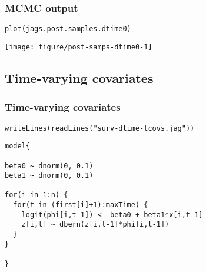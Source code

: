 \documentclass[color=usenames,dvipsnames]{beamer}\usepackage[]{graphicx}\usepackage[]{color}
\makeatletter
\newcommand{\hlstr}[1]{\textcolor[rgb]{0.749,0.012,0.012}{#1}}%
\newcommand{\hlstd}[1]{\textcolor[rgb]{0,0,0}{#1}}%
\newcommand{\hlkwd}[1]{\textcolor[rgb]{0.004,0.004,0.506}{#1}}%
\newenvironment{kframe}{%
 \def\at@end@of@kframe{}%
 \ifinner\ifhmode%
  \def\at@end@of@kframe{\end{minipage}}%
  \begin{minipage}{\columnwidth}%
 \fi\fi%
 \def\FrameCommand##1{\hskip\@totalleftmargin \hskip-\fboxsep
 \colorbox{shadecolor}{##1}\hskip-\fboxsep
     \hskip-\linewidth \hskip-\@totalleftmargin \hskip\columnwidth}%
 \MakeFramed {\advance\hsize-\width
   \@totalleftmargin\z@ \linewidth\hsize
   \@setminipage}}%
 {\par\unskip\endMakeFramed%
 \at@end@of@kframe}
\newenvironment{knitrout}{}{} %
\makeatother
\begin{document}
\begin{frame}[fragile]
  \frametitle{MCMC output}
\begin{knitrout}
\color{fgcolor}\begin{kframe}
\begin{alltt}
\hlkwd{plot}\hlstd{(jags.post.samples.dtime0)}
\end{alltt}
\end{kframe}

{\centering \texttt{[image: figure/post-samps-dtime0-1]} 

}


\end{knitrout}
\end{frame}






\subsection{Time-varying covariates}



\begin{frame}[fragile]
  \frametitle{Time-varying covariates}
\begin{knitrout}
\color{fgcolor}\begin{kframe}
\begin{alltt}
\hlkwd{writeLines}\hlstd{(}\hlkwd{readLines}\hlstd{(}\hlstr{"surv-dtime-tcovs.jag"}\hlstd{))}
\end{alltt}
\end{kframe}
\end{knitrout}
\begin{knitrout}
\color{fgcolor}\begin{kframe}
\begin{verbatim}
model{

beta0 ~ dnorm(0, 0.1)
beta1 ~ dnorm(0, 0.1)

for(i in 1:n) {
  for(t in (first[i]+1):maxTime) {
    logit(phi[i,t-1]) <- beta0 + beta1*x[i,t-1]
    z[i,t] ~ dbern(z[i,t-1]*phi[i,t-1])
  }
}

}
\end{verbatim}
\end{kframe}
\end{knitrout}
\end{frame}
\end{document}
